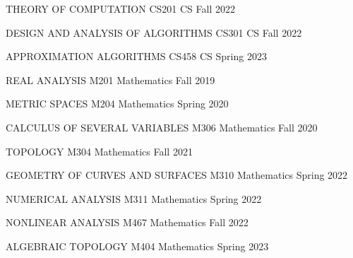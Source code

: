 
\begin{cvhonors}

  \cvhonor
    {THEORY OF COMPUTATION}
    {CS201} %
    {CS} %
    {Fall 2022} %

  \cvhonor
    {DESIGN AND ANALYSIS OF ALGORITHMS}
    {CS301} %
    {CS} %
    {Fall 2022} %



 \cvhonor
{APPROXIMATION ALGORITHMS}
    {CS458} %
    {CS} %
{Spring 2023} %

  \cvhonor
    {REAL ANALYSIS}
    {M201} %
    {Mathematics} %
    {Fall 2019} %

  \cvhonor
{METRIC SPACES}
    {M204} %
    {Mathematics} %
    {Spring 2020} %

  \cvhonor
{CALCULUS OF SEVERAL VARIABLES}
    {M306} %
    {Mathematics} %
    {Fall 2020} %

  \cvhonor
{TOPOLOGY}
    {M304} %
    {Mathematics} %
    {Fall 2021} %

  \cvhonor
	{GEOMETRY OF CURVES AND SURFACES}
    {M310} %
    {Mathematics} %
    {Spring 2022} %

  \cvhonor
	{NUMERICAL ANALYSIS}
    {M311} %
    {Mathematics} %
    {Spring 2022} %

  \cvhonor
{NONLINEAR ANALYSIS}
    {M467} %
    {Mathematics} %
{Fall 2022} %

  \cvhonor
{ALGEBRAIC TOPOLOGY}
    {M404} %
    {Mathematics} %
{Spring 2023} %

 
 \end{cvhonors}

